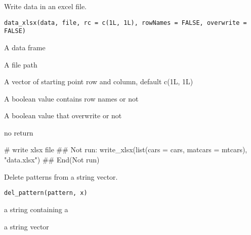 \documentclass[letterpaper]{book}
\begin{document}
%
\begin{Description}
Write data in an excel file.
\end{Description}
%
\begin{Usage}
\begin{verbatim}
data_xlsx(data, file, rc = c(1L, 1L), rowNames = FALSE, overwrite = FALSE)
\end{verbatim}
\end{Usage}
%
\begin{Arguments}
\begin{ldescription}
\item[\code{data}] A data frame

\item[\code{file}] A file path

\item[\code{rc}] A vector of starting point row and column, default c(1L, 1L)

\item[\code{rowNames}] A boolean value contains row names or not

\item[\code{overwrite}] A boolean value that overwrite or not
\end{ldescription}
\end{Arguments}
%
\begin{Value}
no return
\end{Value}
%
\begin{Examples}
\begin{ExampleCode}
# write xlsx file
## Not run: 
write_xlsx(list(cars = cars, matcars = mtcars), "data.xlsx")
## End(Not run)

\end{ExampleCode}
\end{Examples}
%
\begin{Description}
Delete patterns from a string vector.
\end{Description}
%
\begin{Usage}
\begin{verbatim}
del_pattern(pattern, x)
\end{verbatim}
\end{Usage}
%
\begin{Arguments}
\begin{ldescription}
\item[\code{pattern}] a string containing a 

\item[\code{x}] a string vector
\end{ldescription}
\end{Arguments}
\end{document}
